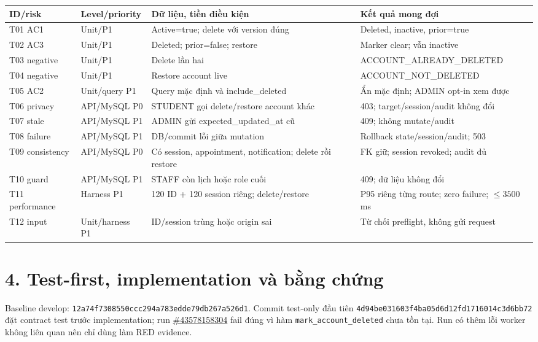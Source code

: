 \documentclass[10pt,a4paper]{article}
\begin{document}
\small
\begin{longtable}{p{.12\linewidth}p{.17\linewidth}p{.40\linewidth}p{.25\linewidth}}
\toprule ID/risk & Level/priority & Dữ liệu, tiền điều kiện & Kết quả mong đợi\\\midrule
\endhead
T01 AC1 & Unit/P1 & Active=true; delete với version đúng & Deleted, inactive, prior=true\\
T02 AC3 & Unit/P1 & Deleted; prior=false; restore & Marker clear; vẫn inactive\\
T03 negative & Unit/P1 & Delete lần hai & ACCOUNT\_ALREADY\_DELETED\\
T04 negative & Unit/P1 & Restore account live & ACCOUNT\_NOT\_DELETED\\
T05 AC2 & Unit/query P1 & Query mặc định và include\_deleted & Ẩn mặc định; ADMIN opt-in xem được\\
T06 privacy & API/MySQL P0 & STUDENT gọi delete/restore account khác & 403; target/session/audit không đổi\\
T07 stale & API/MySQL P1 & ADMIN gửi expected\_updated\_at cũ & 409; không mutate/audit\\
T08 failure & API/MySQL P1 & DB/commit lỗi giữa mutation & Rollback state/session/audit; 503\\
T09 consistency & API/MySQL P0 & Có session, appointment, notification; delete rồi restore & FK giữ; session revoked; audit đủ\\
T10 guard & API/MySQL P1 & STAFF còn lịch hoặc role cuối & 409; dữ liệu không đổi\\
T11 performance & Harness P1 & 120 ID + 120 session riêng; delete/restore & P95 riêng từng route; zero failure; $\leq3500$ms\\
T12 input & Unit/harness P1 & ID/session trùng hoặc origin sai & Từ chối preflight, không gửi request\\
\bottomrule
\end{longtable}
\normalsize

\section*{4. Test-first, implementation và bằng chứng}
Baseline develop: \texttt{12a74f7308550ccc294a783edde79db267a526d1}. Commit test-only đầu tiên \texttt{4d94be031603f4ba05d6d12fd1716014c3d6bb72} đặt contract test trước implementation; run \href{https://github.com/4PMs-3Workers/Production-Readiness-Lab/actions/runs/43578158304}{\#43578158304} fail đúng vì hàm \texttt{mark\_account\_deleted} chưa tồn tại. Run có thêm lỗi worker không liên quan nên chỉ dùng làm RED evidence.
\end{document}

